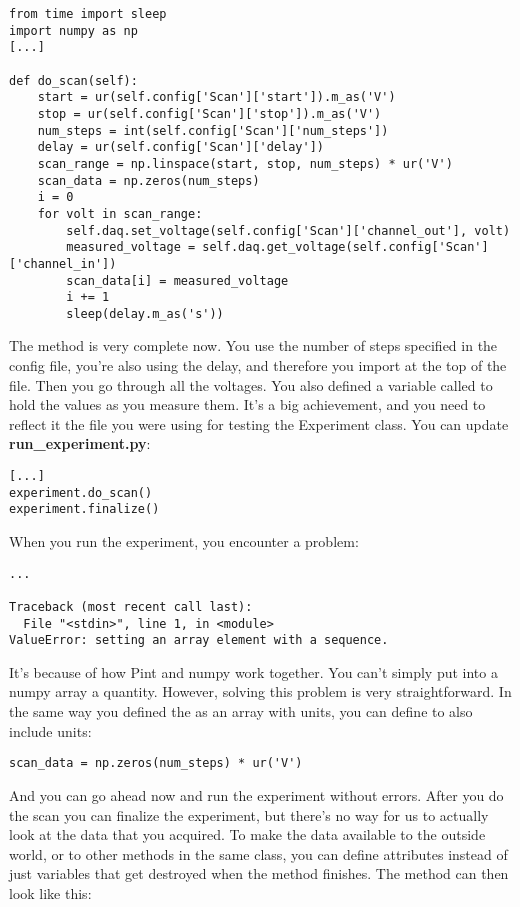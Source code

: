 \begin{verbatim}
from time import sleep
import numpy as np
[...]

def do_scan(self):
    start = ur(self.config['Scan']['start']).m_as('V')
    stop = ur(self.config['Scan']['stop']).m_as('V')
    num_steps = int(self.config['Scan']['num_steps'])
    delay = ur(self.config['Scan']['delay'])
    scan_range = np.linspace(start, stop, num_steps) * ur('V')
    scan_data = np.zeros(num_steps)
    i = 0
    for volt in scan_range:
        self.daq.set_voltage(self.config['Scan']['channel_out'], volt)
        measured_voltage = self.daq.get_voltage(self.config['Scan']['channel_in'])
        scan_data[i] = measured_voltage
        i += 1
        sleep(delay.m_as('s'))
\end{verbatim}

The  method is very complete now. You use the number of steps specified in the config file, you're also using the delay, and therefore you import  at the top of the file. Then you go through all the voltages. You also defined a variable called  to hold the values as you measure them. It's a big achievement, and you need to reflect it the file you were using for testing the Experiment class. You can update \textbf{run\_experiment.py}:

\begin{verbatim}
[...]
experiment.do_scan()
experiment.finalize()
\end{verbatim}

When you run the experiment, you encounter a problem:

\begin{verbatim}
...

Traceback (most recent call last):
  File "<stdin>", line 1, in <module>
ValueError: setting an array element with a sequence.
\end{verbatim}

It's because of how Pint and numpy work together. You can't simply put into a numpy array a quantity. However, solving this problem is very straightforward. In the same way you defined the  as an array with units, you can define  to also include units:

\begin{verbatim}
scan_data = np.zeros(num_steps) * ur('V')
\end{verbatim}

And you can go ahead now and run the experiment without errors. After you do the scan you can finalize the experiment, but there's no way for us to actually look at the data that you acquired. To make the data available to the outside world, or to other methods in the same class, you can define attributes instead of just variables that get destroyed when the method finishes. The  method can then look like this:

